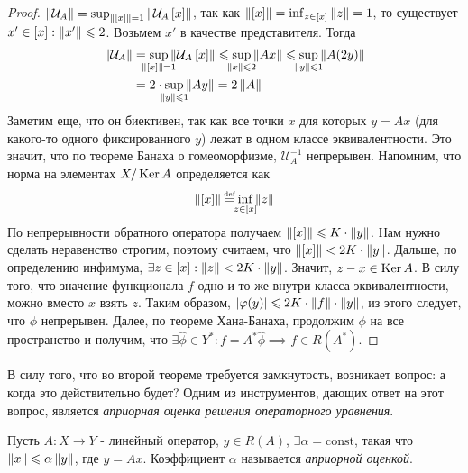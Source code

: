 \begin{proof}
    $\left\|\mathcal{U}_A\right\| = \sup_{\left\|\left[x \right]\right\| = 1} \left\|\mathcal{U}_A\left[x \right]\right\|$,
    так как $\left\|\left[x \right]\right\| = \inf_{z \in \left[x \right]} \left\|z\right\| = 1$,
    то существует $x' \in \left[x \right] : \left\|x'\right\| \leqslant 2$.
    Возьмем $x'$ в качестве представителя. Тогда
    \begin{equation}
        \begin{split}
            \norm{\mathcal{U}_A} & =
            \sup_{\mathclap{\norm{\eqcls{x}} = 1}} \norm{\mathcal{U}_A\eqcls{x}}
            \leqslant \sup_{\mathclap{\norm{x} \leqslant 2}} \norm{Ax}
            \leqslant \sup_{\mathclap{\norm{y} \leqslant 1}} \norm{A(2y)} \\
            & = 2 \cdot \sup_{\mathclap{\norm{y} \leqslant 1}} \norm{Ay}
            = 2 \norm{A}
        \end{split}
    \end{equation}
    Заметим еще, что он биективен, так как все точки $x$ для которых $y = Ax$
    (для какого-то одного фиксированного $y$) лежат в одном классе эквивалентности.
    Это значит, что по теореме Банаха о гомеоморфизме, $\mathcal{U}_A^{-1}$ непрерывен.
    Напомним, что норма на элементах $X/\operatorname{Ker} A$ определяется как
    \begin{gather}
        \norm{\eqcls{x}} \defeq \inf_{\mathclap{z \in \eqcls{x}}} \norm{z}
    \end{gather}
    По непрерывности обратного оператора получаем $\left\|\left[x \right]\right\| \leqslant K \cdot \left\|y\right\|$.
    Нам нужно сделать неравенство строгим, поэтому считаем, что
    $\left\|\left[x \right]\right\| < 2K \cdot \left\|y\right\|$. Дальше, по определению инфимума,
    $\exists z \in \left[x \right] : \left\|z\right\| < 2K \cdot \left\|y\right\|$. Значит, $z - x \in \operatorname{Ker} A$.
    В силу того, что значение функционала $f$ одно и то же внутри класса эквивалентности,
    можно вместо $x$ взять $z$. Таким образом,
    $\left|\varphi(y)\right| \leqslant 2K \cdot \left\|f\right\| \cdot \left\|y\right\|$, из этого следует, что
    $\phi$ непрерывен.
    Далее, по теореме Хана-Банаха, продолжим $\phi$ на все пространство и получим, что
    $\exists \widehat{\phi} \in Y^* : f = A^*\widehat{\phi} \implies f \in R(A^*)$.
\end{proof}

В силу того, что во второй теореме требуется замкнутость,
возникает вопрос: а когда это действительно будет?
Одним из инструментов, дающих ответ на этот вопрос, является
\emph{априорная оценка решения операторного уравнения}.

\begin{definition}
    Пусть $A : X \rightarrow Y$ - линейный оператор,
    $y \in R(A)$, $\exists \alpha=\text{const}$,
    такая что $\left\|x\right\| \leqslant \alpha \left\|y\right\|$,
    где $y = Ax$.
    Коэффициент $\alpha$ называется \emph{априорной оценкой}.
\end{definition}

